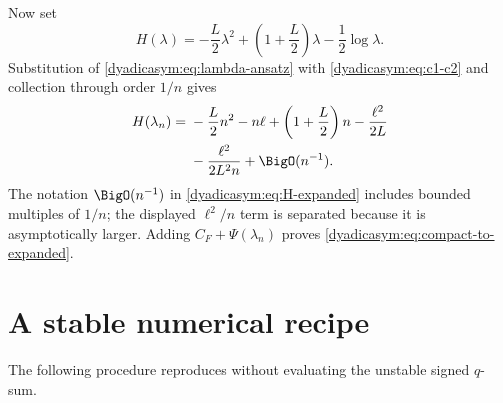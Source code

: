 \documentclass[11pt,oneside]{article}
\theoremstyle{definition}
\theoremstyle{remark}
\begin{document}
Now set
\begin{equation*}
 H(\lambda)=-\frac L2\lambda^2+
 \left(1+\frac L2\right)\lambda-\frac12\log\lambda.
\end{equation*}
Substitution of \eqref{dyadicasym:eq:lambda-ansatz} with \eqref{dyadicasym:eq:c1-c2} and collection through order
$1/n$ gives
\begin{align}
 H(\lambda_n)={}&-\frac L2n^2-n\ell+
 \left(1+\frac L2\right)n-\frac{\ell^2}{2L}                \notag\\
 &-\frac{\ell^2}{2L^2n}+\BigO(n^{-1}).                    \label{dyadicasym:eq:H-expanded}
\end{align}
The notation $\BigO(n^{-1})$ in \eqref{dyadicasym:eq:H-expanded} includes bounded multiples of $1/n$;
the displayed $\ell^2/n$ term is separated because it is asymptotically larger.  Adding
$C_F+\Psi(\lambda_n)$ proves \eqref{dyadicasym:eq:compact-to-expanded}.

\section{A stable numerical recipe}
\label{dyadicasym:app:numerical}

The following procedure reproduces  without evaluating the unstable signed
$q$-sum.
\end{document}
